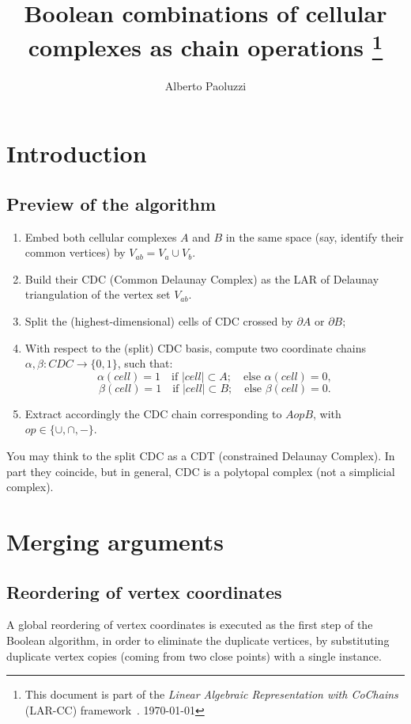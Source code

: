 \documentclass[11pt,oneside]{article}	%
\title{Boolean combinations of cellular complexes as chain operations
\footnote{This document is part of the \emph{Linear Algebraic Representation with CoChains} (LAR-CC) framework~\cite{cclar-proj:2013:00}. \today}
}
\author{Alberto Paoluzzi}
\begin{document}
\maketitle
\tableofcontents
\nonstopmode

\section{Introduction}

\subsection{Preview of the algorithm}


\begin{enumerate}
\item 
Embed both cellular complexes $A$ and $B$ in the same space (say, identify their common vertices) by $V_{ab} = V_a \cup V_b$.
\item 
Build their CDC  (Common Delaunay Complex) as the LAR of Delaunay triangulation of the vertex set $V_{ab}$.
\item 
Split the (highest-dimensional) cells of CDC crossed by $\partial A$ or $\partial B$;
\item 
With respect to the (split) CDC basis, compute two coordinate chains $\alpha,\beta: CDC \to \{0,1\}$, such that: 
\[
	\alpha(cell) = 1  \quad\mbox{if\ } |cell| \subset A;  \quad\mbox{else\ } \alpha(cell) = 0, 
\]
\[
	\beta(cell) = 1  \quad\mbox{if\ } |cell| \subset B;  \quad\mbox{else\ } \beta(cell) = 0.
\]
\item 
Extract accordingly the CDC chain corresponding to $A op B$, with $op\in \{\cup, \cap, -\}$.
\end{enumerate}

You may think to the split CDC as a CDT (constrained Delaunay Complex).  In part they coincide, but in general, CDC is a polytopal complex (not a simplicial complex).




\section{Merging arguments}

\subsection{Reordering of vertex coordinates}
A global reordering of vertex coordinates is executed as the first step of the Boolean algorithm, in order to eliminate the duplicate vertices, by substituting duplicate vertex copies (coming from two close points) with a single instance. 
\end{document}
